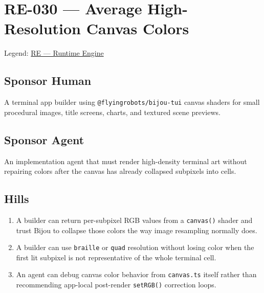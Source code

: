 \chapter{RE-030 --- Average High-Resolution Canvas Colors}\label{record-158}

\smallskip

Legend: \href{https://github.com/flyingrobots/bijou/blob/1853ad902f6bf219326409e7f743a5a1d6517dbc/docs/legends/RE-runtime-engine.md}{RE --- Runtime Engine}

\section{Sponsor Human}\label{record-158-sponsor-human}

A terminal app builder using \texttt{@\allowbreak{}f\allowbreak{}l\allowbreak{}y\allowbreak{}i\allowbreak{}n\allowbreak{}g\allowbreak{}r\allowbreak{}o\allowbreak{}b\allowbreak{}o\allowbreak{}t\allowbreak{}s\allowbreak{}/\allowbreak{}b\allowbreak{}i\allowbreak{}j\allowbreak{}o\allowbreak{}u\allowbreak{}-\allowbreak{}t\allowbreak{}u\allowbreak{}i} canvas shaders for small procedural images, title screens, charts, and textured scene previews.

\section{Sponsor Agent}\label{record-158-sponsor-agent}

An implementation agent that must render high-density terminal art without repairing colors after the canvas has already collapsed subpixels into cells.

\section{Hills}\label{record-158-hills}

\begin{enumerate}
\def\labelenumi{\arabic{enumi}.}
\tightlist
\item
  A builder can return per-subpixel RGB values from a \texttt{c\allowbreak{}a\allowbreak{}n\allowbreak{}v\allowbreak{}a\allowbreak{}s\allowbreak{}(\allowbreak{})} shader and trust Bijou to collapse those colors the way image resampling normally does.
\item
  A builder can use \texttt{b\allowbreak{}r\allowbreak{}a\allowbreak{}i\allowbreak{}l\allowbreak{}l\allowbreak{}e} or \texttt{q\allowbreak{}u\allowbreak{}a\allowbreak{}d} resolution without losing color when the first lit subpixel is not representative of the whole terminal cell.
\item
  An agent can debug canvas color behavior from \texttt{c\allowbreak{}a\allowbreak{}n\allowbreak{}v\allowbreak{}a\allowbreak{}s\allowbreak{}.\allowbreak{}t\allowbreak{}s} itself rather than recommending app-local post-render \texttt{s\allowbreak{}e\allowbreak{}t\allowbreak{}R\allowbreak{}G\allowbreak{}B\allowbreak{}(\allowbreak{})} correction loops.
\end{enumerate}

